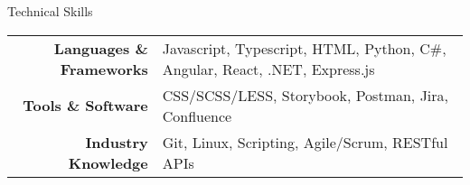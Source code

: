 \documentclass{resume}
\begin{document}
\begin{rSection}{Technical Skills}
  \small
  {
      \begin{tabular}{rl}
      \multicolumn{1}{r|}{\textbf{Languages \& Frameworks}} & Javascript, Typescript, HTML, Python, C\#, Angular, React, .NET, Express.js \\
      \multicolumn{1}{r|}{\textbf{Tools \& Software}} & CSS/SCSS/LESS, Storybook, Postman, Jira, Confluence \\
      \multicolumn{1}{r|}{\textbf{Industry Knowledge}} & Git, Linux, Scripting, Agile/Scrum, RESTful APIs
      \end{tabular}
  }
\end{rSection}



\end{document}
